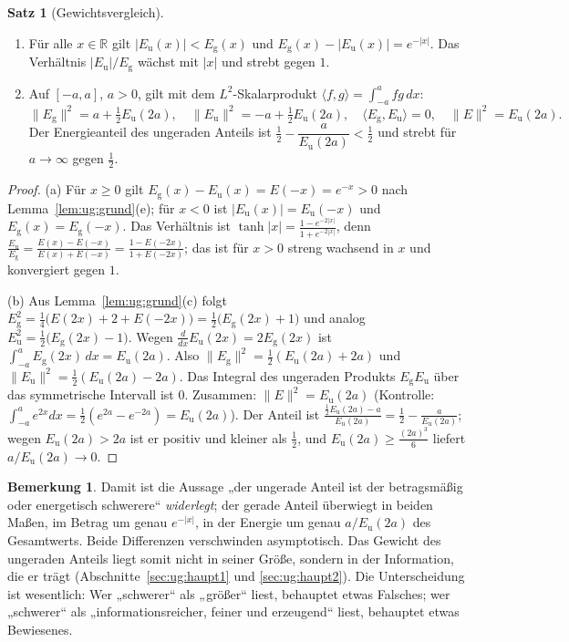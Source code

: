 \documentclass[a4paper,12pt,twoside]{report}
\theoremstyle{definition}
\newtheorem{satz}{Satz}
\newtheorem{bemerkung}{Bemerkung}
\begin{document}
\begin{satz}[Gewichtsvergleich]\label{satz:ug:gewicht}
\begin{enumerate}[label=(\alph*)]
\item Für alle $x\in\mathbb{R}$ gilt $|E_{\mathrm u}(x)|<E_{\mathrm g}(x)$ und $E_{\mathrm g}(x)-|E_{\mathrm u}(x)|=e^{-|x|}$. Das Verhältnis $|E_{\mathrm u}|/E_{\mathrm g}$ wächst mit $|x|$ und strebt gegen $1$.
\item Auf $[-a,a]$, $a>0$, gilt mit dem $L^2$-Skalarprodukt $\langle f,g\rangle=\int_{-a}^{a}fg\,dx$:
\[
\|E_{\mathrm g}\|^2=a+\tfrac12E_{\mathrm u}(2a),\quad \|E_{\mathrm u}\|^2=-a+\tfrac12E_{\mathrm u}(2a),\quad\langle E_{\mathrm g},E_{\mathrm u}\rangle=0,\quad\|E\|^2=E_{\mathrm u}(2a).
\]
Der Energieanteil des ungeraden Anteils ist $\tfrac12-\dfrac{a}{E_{\mathrm u}(2a)}<\tfrac12$ und strebt für $a\to\infty$ gegen $\tfrac12$.
\end{enumerate}
\end{satz}

\begin{proof}
(a) Für $x\ge0$ gilt $E_{\mathrm g}(x)-E_{\mathrm u}(x)=E(-x)=e^{-x}>0$ nach Lemma~\ref{lem:ug:grund}(e); für $x<0$ ist $|E_{\mathrm u}(x)|=E_{\mathrm u}(-x)$ und $E_{\mathrm g}(x)=E_{\mathrm g}(-x)$. Das Verhältnis ist $\tanh|x|=\frac{1-e^{-2|x|}}{1+e^{-2|x|}}$, denn $\frac{E_{\mathrm u}}{E_{\mathrm g}}=\frac{E(x)-E(-x)}{E(x)+E(-x)}=\frac{1-E(-2x)}{1+E(-2x)}$; das ist für $x>0$ streng wachsend in $x$ und konvergiert gegen $1$.

(b) Aus Lemma~\ref{lem:ug:grund}(c) folgt $E_{\mathrm g}^2=\tfrac14\big(E(2x)+2+E(-2x)\big)=\tfrac12\big(E_{\mathrm g}(2x)+1\big)$ und analog $E_{\mathrm u}^2=\tfrac12\big(E_{\mathrm g}(2x)-1\big)$. Wegen $\frac{d}{dx}E_{\mathrm u}(2x)=2E_{\mathrm g}(2x)$ ist $\int_{-a}^{a}E_{\mathrm g}(2x)\,dx=E_{\mathrm u}(2a)$. Also $\|E_{\mathrm g}\|^2=\tfrac12(E_{\mathrm u}(2a)+2a)$ und $\|E_{\mathrm u}\|^2=\tfrac12(E_{\mathrm u}(2a)-2a)$. Das Integral des ungeraden Produkts $E_{\mathrm g}E_{\mathrm u}$ über das symmetrische Intervall ist $0$. Zusammen: $\|E\|^2=E_{\mathrm u}(2a)$ (Kontrolle: $\int_{-a}^ae^{2x}dx=\tfrac12(e^{2a}-e^{-2a})=E_{\mathrm u}(2a)$). Der Anteil ist $\frac{\frac12E_{\mathrm u}(2a)-a}{E_{\mathrm u}(2a)}=\tfrac12-\frac a{E_{\mathrm u}(2a)}$; wegen $E_{\mathrm u}(2a)>2a$ ist er positiv und kleiner als $\tfrac12$, und $E_{\mathrm u}(2a)\ge\frac{(2a)^3}{6}$ liefert $a/E_{\mathrm u}(2a)\to0$.
\end{proof}

\begin{bemerkung}
Damit ist die Aussage „der ungerade Anteil ist der betragsmäßig oder energetisch schwerere“ \emph{widerlegt}; der gerade Anteil überwiegt in beiden Maßen, im Betrag um genau $e^{-|x|}$, in der Energie um genau $a/E_{\mathrm u}(2a)$ des Gesamtwerts. Beide Differenzen verschwinden asymptotisch. Das Gewicht des ungeraden Anteils liegt somit nicht in seiner Größe, sondern in der Information, die er trägt (Abschnitte~\ref{sec:ug:haupt1} und \ref{sec:ug:haupt2}). Die Unterscheidung ist wesentlich: Wer „schwerer“ als „größer“ liest, behauptet etwas Falsches; wer „schwerer“ als „informationsreicher, feiner und erzeugend“ liest, behauptet etwas Bewiesenes.
\end{bemerkung}
\end{document}
